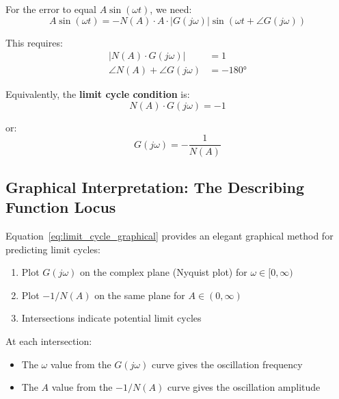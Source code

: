 For the error to equal $A\sin(\omega t)$, we need:
\begin{equation}
A\sin(\omega t) = -N(A) \cdot A \cdot |G(j\omega)|\sin(\omega t + \angle G(j\omega))
\end{equation}

This requires:
\begin{align}
|N(A) \cdot G(j\omega)| &= 1 \label{eq:lc_magnitude} \\
\angle N(A) + \angle G(j\omega) &= -180° \label{eq:lc_phase}
\end{align}

Equivalently, the \textbf{limit cycle condition} is:
\begin{equation}
\boxed{N(A) \cdot G(j\omega) = -1}
\label{eq:limit_cycle_condition}
\end{equation}

or:
\begin{equation}
\boxed{G(j\omega) = -\frac{1}{N(A)}}
\label{eq:limit_cycle_graphical}
\end{equation}

\subsection{Graphical Interpretation: The Describing Function Locus}

Equation~\eqref{eq:limit_cycle_graphical} provides an elegant graphical method for predicting limit cycles:

\begin{enumerate}
    \item Plot $G(j\omega)$ on the complex plane (Nyquist plot) for $\omega \in [0, \infty)$
    \item Plot $-1/N(A)$ on the same plane for $A \in (0, \infty)$
    \item Intersections indicate potential limit cycles
\end{enumerate}

At each intersection:
\begin{itemize}
    \item The $\omega$ value from the $G(j\omega)$ curve gives the oscillation frequency
    \item The $A$ value from the $-1/N(A)$ curve gives the oscillation amplitude
\end{itemize}

